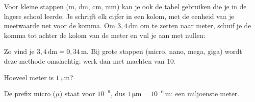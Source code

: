 \documentclass{ximera}
\begin{document}
\begin{remark}[expandable=true,title={Herhaling: de tabel uit de lagere school}]\nl
    Voor kleine stappen (m, dm, cm, mm) kan je ook de tabel gebruiken die je in de lagere school leerde. Je schrijft elk cijfer in een kolom, met de eenheid van je meetwaarde net voor de komma. Om $3{,}4 \, \mathrm{dm}$ om te zetten naar meter, schuif je de komma tot achter de kolom van de meter en vul je aan met nullen:
    \begin{center}
    \end{center}
    Zo vind je $3{,}4 \, \mathrm{dm} = 0{,}34 \, \mathrm{m}$. Bij grote stappen (micro, nano, mega, giga) wordt deze methode omslachtig: werk dan met machten van 10.
\end{remark}

\begin{question}
    Hoeveel meter is $1 \, \mathrm{\mu m}$?

    \begin{multipleChoice}
    \end{multipleChoice}

    \begin{solution}\nl
        De prefix micro ($\mu$) staat voor $10^{-6}$, dus $1 \, \mathrm{\mu m} = 10^{-6} \, \mathrm{m}$: een miljoenste meter.
    \end{solution}
\end{question}
\end{document}
